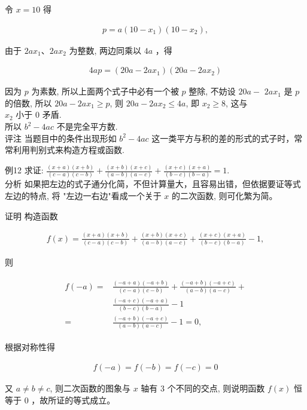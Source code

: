 \documentclass[10pt]{article}
\begin{document}
令 $x=10$ 得

\begin{align*}
p=a\left(10-x_{1}\right)\left(10-x_{2}\right),
\end{align*}

由于 $2 a x_{1} 、 2 a x_{2}$ 为整数, 两边同乘以 $4 a$ ，得

\begin{align*}
4 a p=\left(20 a-2 a x_{1}\right)\left(20 a-2 a x_{2}\right)
\end{align*}

因为 $p$ 为素数, 所以上面两个式子中必有一个被 $p$ 整除, 不妨设 $20 a-$ $2 a x_{1}$ 是 $p$ 的倍数, 所以 $20 a-2 a x_{1} \geqslant p$, 则 $20 a-2 a x_{2} \leqslant 4 a$, 即 $x_{2} \geqslant 8$, 这与\\
$x_{2}$ 小于 0 矛盾.\\
所以 $b^{2}-4 a c$ 不是完全平方数.\\
评注 当题目中的条件出现形如 $b^{2}-4 a c$ 这一类平方与积的差的形式的式子时，常常利用判别式来构造方程或函数.

例12 求证: $\frac{(x+a)(x+b)}{(c-a)(c-b)}+\frac{(x+b)(x+c)}{(a-b)(a-c)}+\frac{(x+c)(x+a)}{(b-c)(b-a)}=1$.\\
分析 如果把左边的式子通分化简，不但计算量大，且容易出错，但依据要证等式左边的特点, 将 "左边一右边"看成一个关于 $x$ 的二次函数, 则可化繁为简。

证明 构造函数

\begin{align*}
f(x)=\frac{(x+a)(x+b)}{(c-a)(c-b)}+\frac{(x+b)(x+c)}{(a-b)(a-c)}+\frac{(x+c)(x+a)}{(b-c)(b-a)}-1,
\end{align*}

则

\begin{align*}
\begin{aligned}
f(-a)= & \frac{(-a+a)(-a+b)}{(c-a)(c-b)}+\frac{(-a+b)(-a+c)}{(a-b)(a-c)}+ \\
& \frac{(-a+c)(-a+a)}{(b-c)(b-a)}-1 \\
= & \frac{(-a+b)(-a+c)}{(a-b)(a-c)}-1=0,
\end{aligned}
\end{align*}

根据对称性得

\begin{align*}
f(-a)=f(-b)=f(-c)=0
\end{align*}

又 $a \neq b \neq c$, 则二次函数的图象与 $x$ 轴有 3 个不同的交点, 则说明函数 $f(x)$ 恒等于 0 ，故所证的等式成立。
\end{document}
